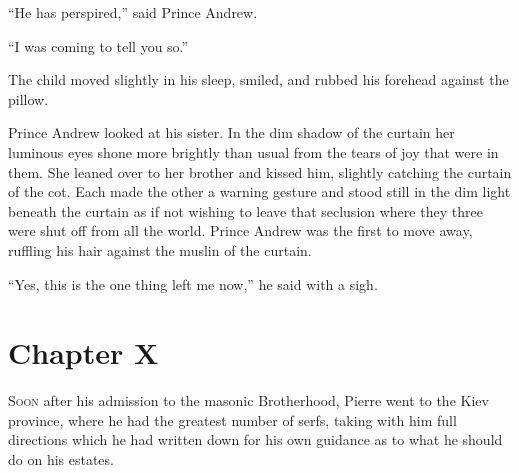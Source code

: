 ``He has perspired,'' said Prince Andrew.

``I was coming to tell you so.''

The child moved slightly in his sleep, smiled, and rubbed his
forehead against the pillow.

Prince Andrew looked at his sister. In the dim shadow of the
curtain her luminous eyes shone more brightly than usual from the
tears of joy that were in them. She leaned over to her brother
and kissed him, slightly catching the curtain of the cot. Each
made the other a warning gesture and stood still in the dim light
beneath the curtain as if not wishing to leave that seclusion
where they three were shut off from all the world. Prince Andrew
was the first to move away, ruffling his hair against the muslin
of the curtain.

``Yes, this is the one thing left me now,'' he said with a sigh.


\chapter*{Chapter X}
\ifaudio     
{} 
\fi

\lettrine[lines=2, loversize=0.3, lraise=0]{\initfamily S}{oon}
after his admission to the masonic Brotherhood, Pierre went
to the Kiev province, where he had the greatest number of serfs,
taking with him full directions which he had written down for his
own guidance as to what he should do on his estates.

